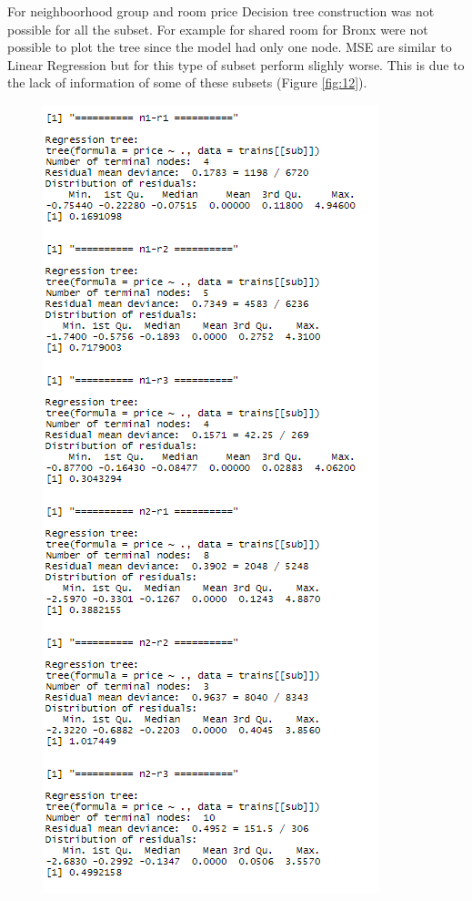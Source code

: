 \documentclass{FR16}
\begin{document}
\noindent For neighboorhood group and room price Decision tree construction was not possible for all the subset. For example for shared room for Bronx were not possible to plot the tree since the model had only one node. MSE are similar to Linear Regression but for this type of subset perform slighly worse. This is due to the lack of information of some of these subsets (Figure \ref{fig:12}).
\newpage
\begin{figure}[!htb]
   \begin{minipage}{0.48\textwidth}
     \centering
     \includegraphics[width=.7\linewidth]{figures/dt2.PNG} 
   \end{minipage}\hfill

\end{figure}
\end{document}
